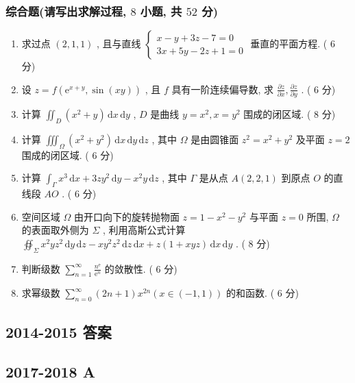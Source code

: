 \documentclass[cn,11pt,fancy,hide]{elegantbook}
\newcommand{\ee}{\mathrm{e}}
\newcommand{\dd}{\,\mathrm{d}}
\begin{document}
\subsubsection{综合题(请写出求解过程, $8$ 小题, 共 $52$ 分)}
\begin{enumerate}
	\item 求过点 $(2,1,1)$ , 且与直线 $\begin{cases}
	x-y+3 z-7=0\\
	3 x+5 y-2 z+1=0
	\end{cases}$ 垂直的平面方程. ( $6$ 分)
	
	\item 设 $z=f\left(\ee^{x+y}, \sin (x y)\right)$ , 且 $f$ 具有一阶连续偏导数, 求 $\frac{\partial z}{\partial x}, \frac{\partial z}{\partial y}$ . ( $6$ 分)
	
	\item 计算 $\iint_{D}\left(x^{2}+y\right) \dd x \dd y$ , $D$ 是曲线 $y=x^{2}, x=y^{2}$ 围成的闭区域. ( $8$ 分)
	
	\item 计算 $\iiint_{\Omega}\left(x^{2}+y^{2}\right) \dd x \dd y \dd z$ , 其中 $\Omega$ 是由圆锥面 $z^{2}=x^{2}+y^{2}$ 及平面 $z=2$ 围成的闭区域. ( $6$ 分)
	
	\item 计算 $\int_{\Gamma} x^{3} \dd x+3 z y^{2} \dd y-x^{2} y \dd z$ , 其中 $\Gamma$ 是从点 $A(2,2,1)$ 到原点 $O$ 的直线段 $AO$ . ( $6$ 分)
	
	\item 空间区域 $\Omega$ 由开口向下的旋转抛物面 $z=1-x^{2}-y^{2}$ 与平面 $z=0$ 所围, $\Omega$ 的表面取外侧为 $\Sigma$ , 利用高斯公式计算 $\oiint_{\Sigma} x^{2} y z^{2} \dd y \dd z-x y^{2} z^{2} \dd z \dd x+z(1+x y z) \dd x \dd y$ . ( $8$ 分)
	
	\item 判断级数 $\sum_{n=1}^{\infty} \frac{n^{\ee}}{\ee^{n}}$ 的敛散性. ( $6$ 分)
	
	\item 求幂级数 $\sum_{n=0}^{\infty}(2 n+1) x^{2 n}(x \in(-1,1))$ 的和函数. ( $6$ 分)
\end{enumerate}


\subsection{2014-2015 答案}

\subsection{2017-2018 A}
\end{document}
